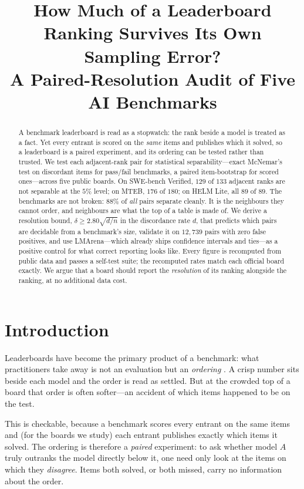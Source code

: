 \documentclass{article}
\title{How Much of a Leaderboard Ranking Survives Its Own Sampling Error?\\
A Paired-Resolution Audit of Five AI Benchmarks}
\begin{document}
\maketitle

\begin{abstract}
A benchmark leaderboard is read as a stopwatch: the rank beside a model is treated as a fact.
Yet every entrant is scored on the \emph{same} items and publishes which it solved, so a
leaderboard is a paired experiment, and its ordering can be tested rather than trusted. We test
each adjacent-rank pair for statistical separability---exact McNemar's test on discordant items for
pass/fail benchmarks, a paired item-bootstrap for scored ones---across five public boards.
On SWE-bench Verified, $129$ of $133$ adjacent ranks are not separable at the $5\%$ level; on MTEB,
$176$ of $180$; on HELM Lite, all $89$ of $89$. The benchmarks are not broken: $88\%$ of \emph{all}
pairs separate cleanly. It is the neighbours they cannot order, and neighbours are what the top of a
table is made of. We derive a resolution bound, $\delta \ge 2.80\sqrt{d/n}$ in the discordance rate
$d$, that predicts which pairs are decidable from a benchmark's size, validate it on $12{,}739$ pairs
with zero false positives, and use LMArena---which already ships confidence intervals and ties---as a
positive control for what correct reporting looks like. Every figure is recomputed from public data
and passes a self-test suite; the recomputed rates match each official board exactly. We argue that a
board should report the \emph{resolution} of its ranking alongside the ranking, at no additional data
cost.
\end{abstract}

\section{Introduction}
Leaderboards have become the primary product of a benchmark: what practitioners take away is not an
evaluation but an \emph{ordering} \citep{hardt2025}. A crisp number sits beside each model and the
order is read as settled. But at the crowded top of a board that order is often softer---an accident
of which items happened to be on the test.

This is checkable, because a benchmark scores every entrant on the same items and (for the boards we
study) each entrant publishes exactly which items it solved. The ordering is therefore a
\emph{paired} experiment: to ask whether model $A$ truly outranks the model directly below it, one
need only look at the items on which they \emph{disagree}. Items both solved, or both missed, carry
no information about the order.
\end{document}
